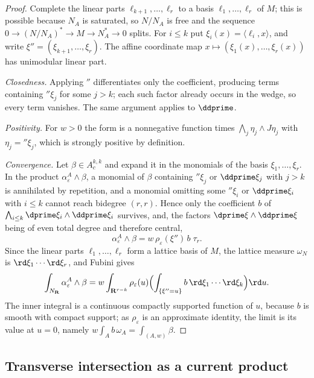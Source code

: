 \begin{proof}
Complete the linear parts $\ell_{k+1},\ldots,\ell_r$ to a basis
$\ell_1,\ldots,\ell_r$ of $M$; this is possible because $N_A$ is saturated,
so $N/N_A$ is free and the sequence
$0\to(N/N_A)^*\to M\to N_A^*\to0$ splits.  For $i\le k$ put
$\xi_i(x)=\langle\ell_i,x\rangle$, and write
$\xi''=(\xi_{k+1},\ldots,\xi_r)$.  The affine coordinate map
$x\mapsto(\xi_1(x),\ldots,\xi_r(x))$ has unimodular linear part.

\emph{Closedness.}  Applying $\dprime$ differentiates only the coefficient,
producing terms containing $\dprime\xi_j$ for some $j>k$; each such factor
already occurs in the wedge, so every term vanishes.  The same argument
applies to $\ddprime$.

\emph{Positivity.}  For $w>0$ the form is a nonnegative function times
$\bigwedge_j\eta_j\wedge J\eta_j$ with $\eta_j=\dprime\xi_j$, which is
strongly positive by definition.

\emph{Convergence.}  Let $\beta\in A^{k,k}_c$ and expand it in the monomials
of the basis $\xi_1,\ldots,\xi_r$.  In the product
$\alpha^A_\varepsilon\wedge\beta$, a monomial of $\beta$ containing
$\dprime\xi_j$ or $\ddprime\xi_j$ with $j>k$ is annihilated by repetition,
and a monomial omitting some $\dprime\xi_i$ or $\ddprime\xi_i$ with
$i\le k$ cannot reach bidegree $(r,r)$.  Hence only the coefficient $b$ of
$\bigwedge_{i\le k}\dprime\xi_i\wedge\ddprime\xi_i$ survives, and, the
factors $\dprime\xi\wedge\ddprime\xi$ being of even total degree and
therefore central,
\[
 \alpha^A_\varepsilon\wedge\beta
 =w\,\rho_\varepsilon(\xi'')\,b\;\tau_r .
\]
Since the linear parts $\ell_1,\ldots,\ell_r$ form a lattice basis of $M$,
the lattice measure $\omega_N$ is
$\rd\xi_1\cdots\rd\xi_r$, and Fubini gives
\[
 \int_{N_{\mathbf R}}\alpha^A_\varepsilon\wedge\beta
 =w\int_{\mathbf R^{r-k}}\rho_\varepsilon(u)
   \Bigl(\int_{\{\xi''=u\}}b\,\rd\xi_1\cdots\rd\xi_k\Bigr)\rd u .
\]
The inner integral is a continuous compactly supported function of $u$,
because $b$ is smooth with compact support; as $\rho_\varepsilon$ is an
approximate identity, the limit is its value at $u=0$, namely
$w\int_Ab\,\omega_A=\int_{(A,w)}\beta$.
\end{proof}

\subsection{Transverse intersection as a current product}
\label{sec:ch11-transverse}

